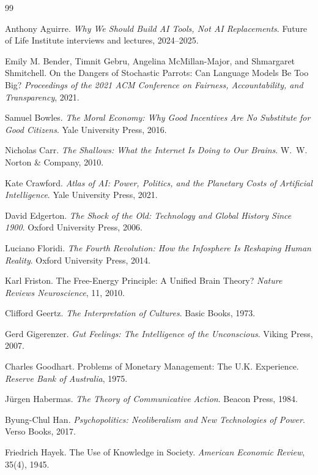\documentclass[12pt, a4paper]{article}
\theoremstyle{remark}
\begin{document}
\begin{thebibliography}{99}

Anthony Aguirre.
\textit{Why We Should Build AI Tools, Not AI Replacements}.
Future of Life Institute interviews and lectures, 2024--2025.

Emily M. Bender, Timnit Gebru, Angelina McMillan-Major, and Shmargaret Shmitchell.
On the Dangers of Stochastic Parrots: Can Language Models Be Too Big?
\textit{Proceedings of the 2021 ACM Conference on Fairness, Accountability, and Transparency}, 2021.

Samuel Bowles.
\textit{The Moral Economy: Why Good Incentives Are No Substitute for Good Citizens}.
Yale University Press, 2016.

Nicholas Carr.
\textit{The Shallows: What the Internet Is Doing to Our Brains}.
W.~W. Norton \& Company, 2010.

Kate Crawford.
\textit{Atlas of AI: Power, Politics, and the Planetary Costs of Artificial Intelligence}.
Yale University Press, 2021.

David Edgerton.
\textit{The Shock of the Old: Technology and Global History Since 1900}.
Oxford University Press, 2006.

Luciano Floridi.
\textit{The Fourth Revolution: How the Infosphere Is Reshaping Human Reality}.
Oxford University Press, 2014.

Karl Friston.
The Free-Energy Principle: A Unified Brain Theory?
\textit{Nature Reviews Neuroscience}, 11, 2010.

Clifford Geertz.
\textit{The Interpretation of Cultures}.
Basic Books, 1973.

Gerd Gigerenzer.
\textit{Gut Feelings: The Intelligence of the Unconscious}.
Viking Press, 2007.

Charles Goodhart.
Problems of Monetary Management: The U.K. Experience.
\textit{Reserve Bank of Australia}, 1975.

J\"{u}rgen Habermas.
\textit{The Theory of Communicative Action}.
Beacon Press, 1984.

Byung-Chul Han.
\textit{Psychopolitics: Neoliberalism and New Technologies of Power}.
Verso Books, 2017.

Friedrich Hayek.
The Use of Knowledge in Society.
\textit{American Economic Review}, 35(4), 1945.


\end{thebibliography}
\end{document}
